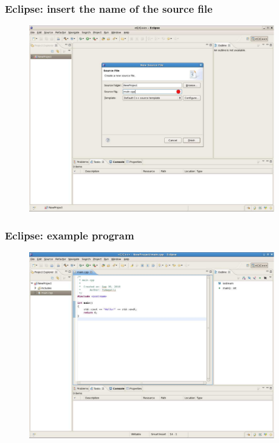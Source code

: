 \documentclass{beamer}
\begin{document}

\begin{frame}[fragile]

    \frametitle{Eclipse: insert the name of the source file}

    \begin{figure}
        \centering
        \includegraphics[width=0.95\textwidth]{./images/eclipse4}
    \end{figure}

\end{frame}


\begin{frame}[fragile]

    \frametitle{Eclipse: example program}

    \begin{figure}
        \centering
        \includegraphics[width=0.95\textwidth]{./images/eclipse5}
    \end{figure}

\end{frame}
\end{document}
